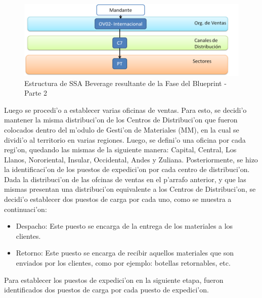 \begin{figure}[H]
\centering
\includegraphics[scale=0.65,type=png,ext=.png,read=.png]{figures/Org2}
\caption{Estructura de SSA Beverage resultante de la Fase del Blueprint - Parte 2}
\label{fig:estructura2}
\end{figure}
Luego se procedi'o a establecer varias oficinas de ventas. Para esto, se decidi'o mantener la misma distribuci'on de los Centros de Distribuci'on que fueron colocados dentro del m'odulo de Gesti'on de Materiales (MM), en la cual se dividi'o al territorio en varias regiones. Luego, se defini'o una oficina por cada regi'on, quedando las mismas de la siguiente manera: Capital, Central, Los Llanos, Nororiental, Insular, Occidental, Andes y Zuliana.
\newline
\newline
	Posteriormente, se hizo la identificaci'on de los puestos de expedici'on por cada centro de distribuci'on. Dada la distribuci'on de las ofcinas de ventas en el p'arrafo anterior, y que las mismas presentan una distribuci'on equivalente a los Centros de Distribuci'on, se decidi'o establecer dos puestos de carga por cada uno, como se muestra a continuaci'on:
\begin{itemize}
\item Despacho: Este puesto se encarga de la entrega de los materiales a los clientes.
\item Retorno: Este puesto se encarga de recibir aquellos materiales que son enviados por los clientes, como por ejemplo: botellas retornables, etc.
\end{itemize}
	Para establecer los puestos de expedici'on en la siguiente etapa, fueron identificados dos puestos de carga por cada puesto de expedici'on.
